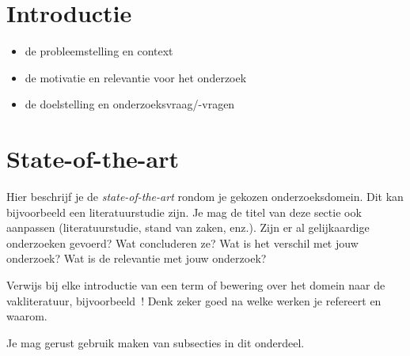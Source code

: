 
\section{Introductie} %
\label{sec:introductie}


\autocite{morris2014wireless}


\begin{itemize}
  \item de probleemstelling en context
  \item de motivatie en relevantie voor het onderzoek
  \item de doelstelling en onderzoeksvraag/-vragen
\end{itemize}


\section{State-of-the-art}
\label{sec:state-of-the-art}

Hier beschrijf je de \emph{state-of-the-art} rondom je gekozen onderzoeksdomein. Dit kan bijvoorbeeld een literatuurstudie zijn. Je mag de titel van deze sectie ook aanpassen (literatuurstudie, stand van zaken, enz.). Zijn er al gelijkaardige onderzoeken gevoerd? Wat concluderen ze? Wat is het verschil met jouw onderzoek? Wat is de relevantie met jouw onderzoek?

Verwijs bij elke introductie van een term of bewering over het domein naar de vakliteratuur, bijvoorbeeld~\autocite{Doll1954}! Denk zeker goed na welke werken je refereert en waarom.


Je mag gerust gebruik maken van subsecties in dit onderdeel.


